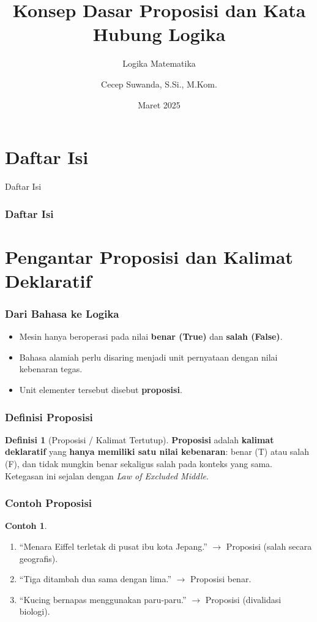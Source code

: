 \documentclass[handout]{beamer}
\subtitle[Logika Matematika]{Logika Matematika}
\title[Proposisi dan Kata Hubung Logika]{Konsep Dasar Proposisi dan Kata Hubung Logika}
\author{Cecep Suwanda, S.Si., M.Kom.}
\date{Maret 2025}
\institute{Universitas Bale Bandung}
\theoremstyle{definition}
\newtheorem{definisi}[theorem]{Definisi}
\theoremstyle{example}
\newtheorem{contoh}[theorem]{Contoh}
\begin{document}
\maketitle

\section*{Daftar Isi}
\begin{frame}{Daftar Isi}
\frametitle{Daftar Isi}
\tableofcontents
\end{frame}

\section{Pengantar Proposisi dan Kalimat Deklaratif}

\begin{frame}
\frametitle{Dari Bahasa ke Logika}
\begin{itemize}
  \item Mesin hanya beroperasi pada nilai \textbf{benar (True)} dan \textbf{salah (False)}.
  \item Bahasa alamiah perlu disaring menjadi unit pernyataan dengan nilai kebenaran tegas.
  \item Unit elementer tersebut disebut \textbf{proposisi}.
\end{itemize}
\end{frame}

\begin{frame}
\frametitle{Definisi Proposisi}
\begin{definisi}[Proposisi / Kalimat Tertutup]
\textbf{Proposisi} adalah \textbf{kalimat deklaratif} yang \textbf{hanya memiliki satu nilai kebenaran}: benar (T) atau salah (F), dan tidak mungkin benar sekaligus salah pada konteks yang sama.\\
Ketegasan ini sejalan dengan \textit{Law of Excluded Middle}.
\end{definisi}
\end{frame}

\begin{frame}
\frametitle{Contoh Proposisi}
\begin{contoh}
\begin{enumerate}
  \item ``Menara Eiffel terletak di pusat ibu kota Jepang.'' $\rightarrow$ Proposisi (salah secara geografis).
  \item ``Tiga ditambah dua sama dengan lima.'' $\rightarrow$ Proposisi benar.
  \item ``Kucing bernapas menggunakan paru-paru.'' $\rightarrow$ Proposisi (divalidasi biologi).
\end{enumerate}
\end{contoh}
\end{frame}
\end{document}
